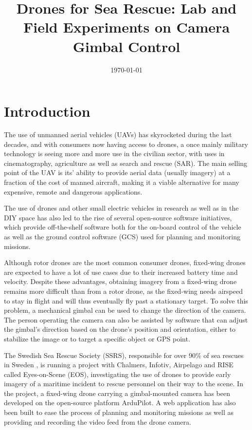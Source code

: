 \documentclass[nofilelist]{cslthse-msc}
\title{Drones for Sea Rescue: Lab and Field Experiments on Camera Gimbal Control}
\date{\today}
\begin{document}
\renewcommand{\bibname}{References}

\makefrontmatter


\chapter{Introduction}
The use of unmanned aerial vehicles (UAVs) has skyrocketed during the last decades, and with consumers now having access to drones, a once mainly military technology is seeing more and more use in the civilian sector, with uses in cinematography, agriculture as well as search and rescue (SAR). The main selling point of the UAV is its' ability to provide aerial data (usually imagery) at a fraction of the cost of manned aircraft, making it a viable alternative for many expensive, remote and dangerous applications.

The use of drones and other small electric vehicles in research as well as in the DIY space has also led to the rise of several open-source software initiatives, which provide off-the-shelf software both for the on-board control of the vehicle as well as the ground control software (GCS) used for planning and monitoring missions. 

Although rotor drones are the most common consumer drones, fixed-wing drones are expected to have a lot of use cases due to their increased battery time and velocity. Despite these advantages, obtaining imagery from a fixed-wing drone remains more difficult than from a rotor drone, as the fixed-wing needs airspeed to stay in flight and will thus eventually fly past a stationary target. To solve this problem, a mechanical gimbal can be used to change the direction of the camera. The person operating the camera can also be assisted by software that can adjust the gimbal's direction based on the drone's position and orientation, either to stabilize the image or to target a specific object or GPS point.

The Swedish Sea Rescue Society (SSRS), responsible for over 90\% of sea rescues in Sweden \cite{ssrs}, is running a project with Chalmers, Infotiv, Airpelago and RISE called Eyes-on-Scene (EOS), investigating the use of drones to provide early imagery of a maritime incident to rescue personnel on their way to the scene. In the project, a fixed-wing drone carrying a gimbal-mounted camera has been developed on the open-source platform ArduPilot. A web application has also been built to ease the process of planning and monitoring missions as well as providing and recording the video feed from the drone camera.
\end{document}
